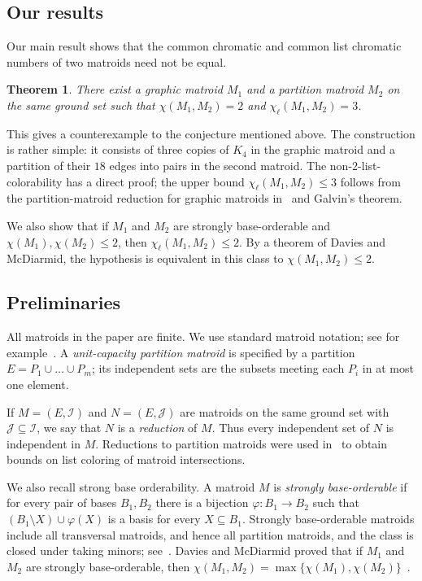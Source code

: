\documentclass[10pt,a4paper]{article}
\theoremstyle{plain}
\newtheorem{thm}{Theorem}[section]
\theoremstyle{definition}
\newcommand{\cI}{\mathcal{I}}
\begin{document}
\subsection{Our results}

Our main result shows that the common chromatic and common list chromatic numbers of two matroids need not be equal.


\begin{thm}\label{thm:counterintro}
There exist a graphic matroid $M_1$ and a partition matroid $M_2$ on the same ground set such that $\chi(M_1,M_2)=2$ and $\chi_\ell(M_1,M_2)=3$.
\end{thm}


This gives a counterexample to the conjecture mentioned above. The construction is rather simple: it consists of three copies of $K_4$ in the graphic matroid and a partition of their $18$ edges into pairs in the second matroid. The non-$2$-list-colorability has a direct proof; the upper bound $\chi_\ell(M_1,M_2)\le3$ follows from the partition-matroid reduction for graphic matroids in~\cite{berczi2021list} and Galvin's theorem.

We also show that if $M_1$ and $M_2$ are strongly base-orderable and $\chi(M_1),\chi(M_2)\le2$, then $\chi_\ell(M_1,M_2)\le2$. By a theorem of Davies and McDiarmid, the hypothesis is equivalent in this class to $\chi(M_1,M_2)\le2$.

\subsection{Preliminaries}
\label{sec:preliminaries}

All matroids in the paper are finite. We use standard matroid notation; see for example~\cite{schrijver2003combinatorial}. A \textit{ unit-capacity partition matroid} is specified by a partition $E=P_1\cup\dots\cup P_m$; its independent sets are the subsets meeting each $P_i$ in at most one element.

If $M=(E,\cI)$ and $N=(E,\mathcal{J})$ are matroids on the same ground set with $\mathcal{J}\subseteq\cI$, we say that $N$ is a \textit{reduction} of $M$. Thus every independent set of $N$ is independent in $M$. Reductions to partition matroids were used in~\cite{berczi2021list} to obtain bounds on list coloring of matroid intersections.

We also recall strong base orderability. A matroid $M$ is \textit{strongly base-orderable} if for every pair of bases $B_1,B_2$ there is a bijection $\varphi\colon B_1\to B_2$ such that $(B_1\setminus X)\cup\varphi(X)$ is a basis for every $X\subseteq B_1$. Strongly base-orderable matroids include all transversal matroids, and hence all partition matroids, and the class is closed under taking minors; see~\cite[Section~42.6c]{schrijver2003combinatorial}. Davies and McDiarmid proved that if $M_1$ and $M_2$ are strongly base-orderable, then $\chi(M_1,M_2)=\max\{\chi(M_1),\chi(M_2)\}$~\cite{davies1976disjoint}.
\end{document}
